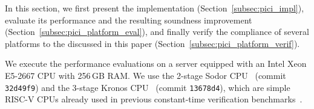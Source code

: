 In this section, we first present the \PICI implementation (Section~\ref{subsec:pici_impl}), evaluate its performance and the resulting soundness improvement (Section~\ref{subsec:pici_platform_eval}), and finally verify the compliance of several platforms to the \pics discussed in this paper (Section~\ref{subsec:pici_platform_verif}).

We execute the performance evaluations on a server equipped with an Intel Xeon E5-2667 CPU with 256\,GB RAM.
We use the 2-stage Sodor CPU~\cite{sodor} (commit \texttt{32d49f9}) and the 3-stage Kronos CPU~\cite{kronos} (commit \texttt{13678d4}), which are simple RISC-V CPUs already used in previous constant-time verification benchmarks~\cite{wang2023specification,tan2025contractshadowlogic,ceesay2024mucfi}.



